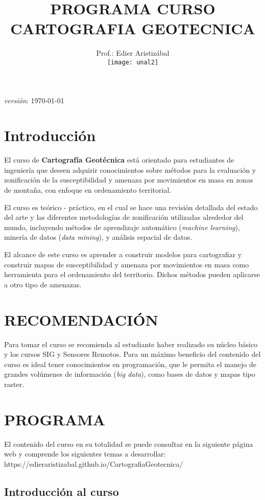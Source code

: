 \documentclass[twoside,11pt,]{article}
\title {PROGRAMA  CURSO\\ CARTOGRAFIA GEOTECNICA}
\author{Prof.: Edier Aristizábal\\[5ex]
\texttt{[image: unal2]}
}
\date{}
\begin{document}
\maketitle

\emph {versión}: \today

\section* {Introducción}
El curso de \textbf{Cartografía Geotécnica} está orientado para estudiantes de ingeniería que deseen adquirir conocimientos sobre métodos para la evaluación
 y zonificación de la susceptibilidad y amenaza por movimientos en masa en zonas de montaña, con enfoque en ordenamiento territorial.
\par El curso es teórico - práctico, en el cual se hace una revisión detallada del estado del arte y las diferentes metodologías de zonificación utilizadas 
alrededor del mundo, incluyendo métodos de aprendizaje automático (\emph{machine learning}), minería de datos (\emph{data mining}), y análisis espacial de datos.
\par El alcance de este curso es aprender a construir modelos para cartografiar y construir mapas de susceptibilidad y amenaza por movimientos en masa 
como herramienta para el ordenamiento del territorio. Dichos métodos pueden aplicarse a otro tipo de amenazas.

\section{RECOMENDACIÓN}
Para tomar el curso se recomienda al estudiante haber realizado su núcleo básico y los cursos SIG y Sensores Remotos. Para un máximo beneficio del contenido 
del curso es ideal tener conocimientos en programación, que le permita el manejo de grandes volúmenes de información (\emph{big data}), como bases de datos 
y mapas tipo raster.

\section{PROGRAMA}
El contenido del curso en su totalidad se puede consultar en la siguiente página web y comprende los siguientes temas a desarrollar:\\

https://edieraristizabal.github.io/CartografiaGeotecnica/

\subsection*{Introducción al curso}
\end{document}
